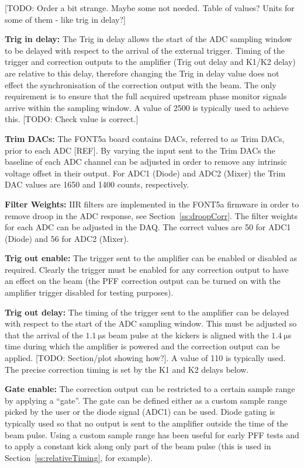 [TODO: Order a bit strange. Maybe some not needed. Table of values? Units for some of them - like trig in delay?]

\textbf{Trig in delay:} The Trig in delay allows the start of the ADC sampling window to be delayed with respect to the arrival of the external trigger. Timing of the trigger and correction outputs to the amplifier (Trig out delay and K1/K2 delay) are relative to this delay, therefore changing the Trig in delay value does not effect the synchronisation of the correction output with the beam. The only requirement is to ensure that the full acquired upstream phase monitor signals arrive within the sampling window. A value of 2500 is typically used to achieve this. [TODO: Check value is correct.]

\textbf{Trim DACs:} The FONT5a board contains DACs, referred to as Trim DACs, prior to each ADC [REF]. By varying the input sent to the Trim DACs the baseline of each ADC channel can be adjusted in order to remove any intrinsic voltage offset in their output. For ADC1 (Diode) and ADC2 (Mixer) the Trim DAC values are 1650 and 1400 counts, respectively.

\textbf{Filter Weights:} IIR filters are implemented in the FONT5a firmware in order to remove droop in the ADC response, see Section~\ref{ss:droopCorr}. The filter weights for each ADC can be adjusted in the DAQ. The correct values are 50 for ADC1 (Diode) and 56 for ADC2 (Mixer).

\textbf{Trig out enable:} The trigger sent to the amplifier can be enabled or disabled as required. Clearly the trigger must be enabled for any correction output to have an effect on the beam (the PFF correction output can be turned on with the amplifier trigger disabled for testing purposes).

\textbf{Trig out delay:} The timing of the trigger sent to the amplifier can be delayed with respect to the start of the ADC sampling window. This must be adjusted so that the arrival of the \(1.1~\mathrm{\mu}\)s beam pulse at the kickers is aligned with the \(1.4~\mathrm{\mu}\)s time during which the amplifier is powered and the correction output can be applied. [TODO: Section/plot showing how?]. A value of 110 is typically used. The precise correction timing is set by the K1 and K2 delays below.

\textbf{Gate enable:} The correction output can be restricted to a certain sample range by applying a ``gate''. The gate can be defined either as a custom sample range picked by the user or the diode signal (ADC1) can be used. Diode gating is typically used so that no output is sent to the amplifier outside the time of the beam pulse. Using a custom sample range has been useful for early PFF tests and to apply a constant kick along only part of the beam pulse (this is used in Section~\ref{ss:relativeTiming}, for example).

